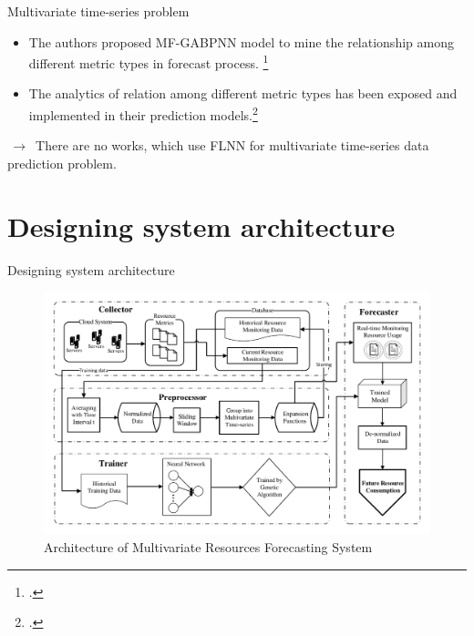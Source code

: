 \documentclass{beamer}
\begin{document}
\begin{frame}{Multivariate time-series problem}
	\begin{itemize}
		\item{
			\small The authors proposed MF-GABPNN model to mine the relationship among different metric types in forecast process. \footcite{Tran et al. 2017}
		}
		\item{
			\small The analytics of relation among different metric types has been exposed and implemented in their prediction models.\footcite{Tran et al. 2018}
		}
	\end{itemize}
	$\,\to\,$ There are no works, which use FLNN for multivariate time-series data prediction problem.
\end{frame}


\section{Designing system architecture}
\begin{frame}{Designing system architecture}
	\begin{figure}
		\centering
		\includegraphics[scale=0.42]{FLGANN_system.pdf}
		\caption*{Architecture of Multivariate Resources Forecasting System}
		\label{fig:overall}
	\end{figure}
\end{frame}
\end{document}

